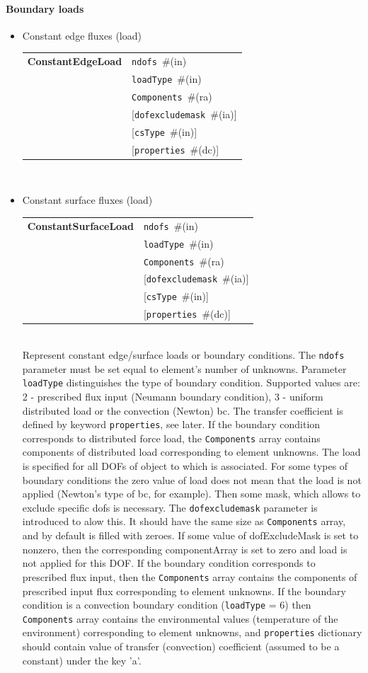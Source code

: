 \documentclass[a4paper]{article}
\makeatletter
\newcommand{\param}[1]{\texttt{#1}} %
\newcommand{\optional}[1]{[#1]} %
\newcommand{\field}[2]{\param{#1}~\#{\tiny(#2)}} %
\newcommand{\optField}[2]{\optional{\field{#1}{#2}}}
\newcommand{\entKeywordInst}[1]{\textbf{#1}} %
\newenvironment{record}[1][]{\begin{tabular}{|ll}}{\end{tabular}\\}
\newcommand{\recentry}[2]{{#1}&{#2}\\}
\newcounter{rcc}
\newenvironment{record}[1][\textwidth]{\setcounter{rcc}{0}\begin{tabular*}{#1}{|ll@{\extracolsep{\fill}}r}}{\end{tabular*}\\}
\newcommand{\recentry}[2]{\ifthenelse{\value{rcc}>0}{&$\backslash$ \\}{\setcounter{rcc}{1}}{#1}&{#2}}
\makeatother
\begin{document}
\paragraph{Boundary loads}
\begin{itemize}
\item Constant edge fluxes (load)

\begin{record}[0.9\textwidth]
  \recentry{\entKeywordInst{ConstantEdgeLoad}}{\field{ndofs}{in}}
  \recentry{}{\field{loadType}{in}}
  \recentry{}{\field{Components}{ra}}
  \recentry{}{\optField{dofexcludemask}{ia}}
  \recentry{}{\optField{csType}{in}}
  \recentry{}{\optField{properties}{dc}}
\end{record}
\item Constant surface fluxes (load)

\begin{record}[0.9\textwidth]
  \recentry{\entKeywordInst{ConstantSurfaceLoad}}{\field{ndofs}{in}}
  \recentry{}{\field{loadType}{in}}
  \recentry{}{\field{Components}{ra}}
  \recentry{}{\optField{dofexcludemask}{ia}}
  \recentry{}{\optField{csType}{in}}
  \recentry{}{\optField{properties}{dc}}
\end{record}
Represent constant edge/surface loads or boundary conditions. The \param{ndofs} parameter must be set
equal to element's number of unknowns. Parameter \param{loadType}
distinguishes the type of boundary condition. Supported values are:
2 - prescribed flux input (Neumann boundary condition), 3 - uniform distributed load or the convection (Newton) bc. The transfer coefficient is defined by keyword \param{properties}, see later.
If the boundary condition corresponds to distributed force load, the
\param{Components} array contains components of distributed load
corresponding to element unknowns.
The load is specified for all DOFs of object to which is associated.
For some types of boundary conditions the zero value of load does not mean
that the load is not applied (Newton's type of bc, for example). Then
some mask, which allows to exclude specific dofs is necessary.
The \param{dofexcludemask} parameter is introduced to alow this.
It should have the same size as \param{Components} array, and by
default is filled with zeroes. If some value of dofExcludeMask is set
to nonzero, then the corresponding componentArray
is set to zero and load is not applied for this DOF.
If the boundary condition corresponds to prescribed flux input, then
the \param{Components} array contains the components of prescribed
input flux corresponding to element unknowns.
If the boundary condition is a convection boundary condition
(\param{loadType} = 6) then \param{Components} array contains the
environmental values (temperature of the environment) corresponding to
element unknowns, and \param{properties} dictionary should contain
value of transfer (convection) coefficient (assumed to be a constant) under the key 'a'.



\end{itemize}
\end{document}
